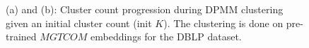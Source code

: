 \begin{figure}[ht]
\centering


\caption{
(a) and (b): Cluster count progression during DPMM clustering given an initial cluster count (init $K$). The clustering is done on pre-trained $MGTCOM$ embeddings for the DBLP dataset.
}
\label{fig:ablation_k}
\end{figure}